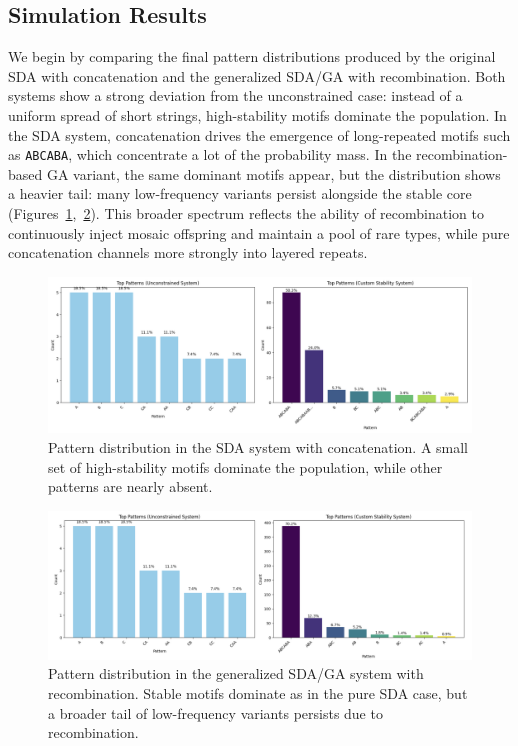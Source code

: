 \documentclass[life,article,submit,pdftex,moreauthors]{Definitions/mdpi}
\begin{document}
\subsection{Simulation Results}

We begin by comparing the final pattern distributions produced by the original SDA with concatenation and the generalized SDA/GA with recombination. Both systems show a strong deviation from the unconstrained case: instead of a uniform spread of short strings, high-stability motifs dominate the population. In the SDA system, concatenation drives the emergence of long-repeated motifs such as \texttt{ABCABA}, which concentrate a lot of the probability mass. In the recombination-based GA variant, the same dominant motifs appear, but the distribution shows a heavier tail: many low-frequency variants persist alongside the stable core (Figures~\ref{fig:concat-patterns},~\ref{fig:ga-patterns}). This broader spectrum reflects the ability of recombination to continuously inject mosaic offspring and maintain a pool of rare types, while pure concatenation channels more strongly into layered repeats.

\begin{figure}[H]
    \centering
    \includegraphics[width=1\textwidth]{SDA-concat-patterns.png}
    \caption{Pattern distribution in the SDA system with concatenation. A small set of high-stability motifs dominate the population, while other patterns are nearly absent.}
    \label{fig:concat-patterns}
\end{figure}

\begin{figure}[H]
    \centering
    \includegraphics[width=1\textwidth]{SDA-GA-patterns.png}
    \caption{Pattern distribution in the generalized SDA/GA system with recombination. Stable motifs dominate as in the pure SDA case, but a broader tail of low-frequency variants persists due to recombination.}
    \label{fig:ga-patterns}
\end{figure}
\end{document}
